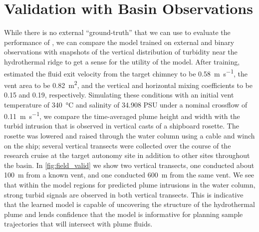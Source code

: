 \section{\PHUMES Validation with Basin Observations}
\label{sec:field_phumes}
While there is no external ``ground-truth'' that we can use to evaluate the performance of \PHORTEX, we can compare the \PHUMES model trained on external and binary \Sentry observations with snapshots of the vertical distribution of turbidity near the hydrothermal ridge to get a sense for the utility of the \PHUMES model. After training, \PHUMES estimated the fluid exit velocity from the target chimney to be \SI{0.58}{\meter\per\second}, the vent area to be \SI{0.82}{\meter\squared}, and the vertical and horizontal mixing coefficients to be 0.15 and 0.19, respectively. Simulating these conditions with an initial vent temperature of \SI{340}{\celsius} and salinity of 34.908 PSU under a nominal crossflow of \SI{0.11}{\meter\per\second}, we compare the time-averaged plume height and width with the turbid intrusion that is observed in vertical casts of a shipboard rosette. The rosette was lowered and raised through the water column using a cable and winch on the ship; several vertical transects were collected over the course of the research cruise at the target autonomy site in addition to other sites throughout the basin. In \cref{fig:field_valid} we show two vertical transects, one conducted about \SI{100}{\meter} from a known vent, and one conducted \SI{600}{\meter} from the same vent. We see that within the model regions for predicted plume intrusions in the water column, strong turbid signals are observed in both vertical transects. This is indicative that the learned \PHUMES model is capable of uncovering the structure of the hydrothermal plume and lends confidence that the model is informative for planning sample trajectories that will intersect with plume fluids.


